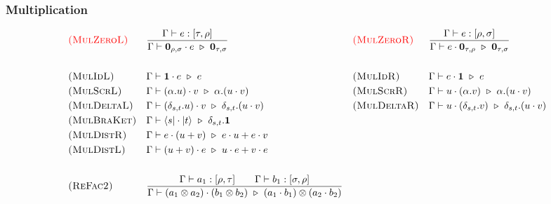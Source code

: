 \subsubsection*{Multiplication}
\begin{align*}
  & \textcolor{red}{\textsc{(MulZeroL)}}
  && \frac{\Gamma \vdash e : [\tau, \rho]}{\Gamma \vdash \textbf{0}_{\rho, \sigma} \cdot e \ \triangleright\  \textbf{0}_{\tau, \sigma}}
  && \textcolor{red}{\textsc{(MulZeroR)}}
  && \frac{\Gamma \vdash e : [\rho, \sigma]}{\Gamma \vdash e \cdot \textbf{0}_{\tau, \rho} \ \triangleright\  \textbf{0}_{\tau, \sigma}} \\
  \\
  & \textsc{(MulIdL)} && \Gamma \vdash \mathbf{1} \cdot e \ \triangleright\  e 
  && \textsc{(MulIdR)} && \Gamma \vdash e \cdot \mathbf{1} \ \triangleright\  e 
  \\
  & \textsc{(MulScrL)} && \Gamma \vdash (\alpha.u) \cdot v \ \triangleright\  \alpha.(u \cdot v)
  && \textsc{(MulScrR)} && \Gamma \vdash u \cdot (\alpha.v) \ \triangleright\  \alpha.(u \cdot v)
  \\
  & \textsc{(MulDeltaL)} && \Gamma \vdash (\delta_{s, t}.u) \cdot v \ \triangleright\  \delta_{s, t}.(u \cdot v)
  && \textsc{(MulDeltaR)} && \Gamma \vdash u \cdot (\delta_{s, t}.v) \ \triangleright\  \delta_{s, t}.(u \cdot v)
  \\
  & \textsc{(MulBraKet)} && \Gamma \vdash \langle s| \cdot |t\rangle \ \triangleright\  \delta_{s, t}.\mathbf{1} \\ 
  & \textsc{(MulDistR)} && \Gamma \vdash e \cdot (u + v) \ \triangleright\  e \cdot u + e \cdot v \\
  & \textsc{(MulDistL)} && \Gamma \vdash (u + v) \cdot e \ \triangleright\  u \cdot e + v \cdot e \\
  \\
  & \textsc{(ReFac2)} && \frac{\Gamma \vdash a_1 : [\rho, \tau] \qquad \Gamma \vdash b_1 : [\sigma, \rho]}{\Gamma \vdash (a_1 \otimes a_2) \cdot (b_1 \otimes b_2) \ \triangleright\  (a_1 \cdot b_1) \otimes (a_2 \cdot b_2)} \\
\end{align*}

